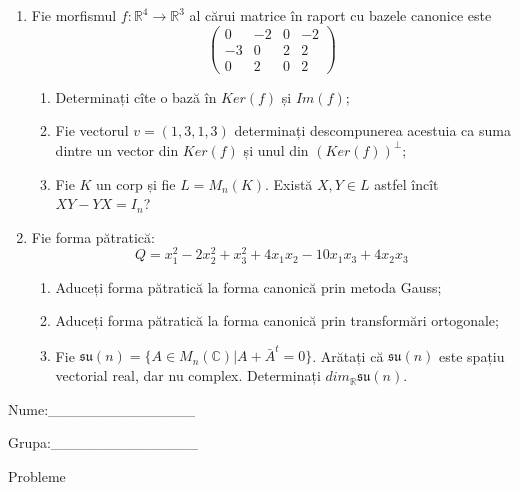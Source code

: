 \documentclass{article}
\begin{document}
\begin{enumerate}
 \item Fie morfismul $f:\mathbb{R}^4 \to \mathbb{R}^3$ al cărui matrice în raport cu bazele canonice este
$$\begin{pmatrix}
0&-2&0&-2\\
-3&0&2&2\\
0&2&0&2
\end{pmatrix}$$

\begin{enumerate}
\item Determinați cîte o bază în $Ker(f)$ și $Im(f)$;
\item Fie vectorul $v=(1,3,1,3)$ determinați descompunerea acestuia ca suma dintre un vector din $Ker(f)$ și unul din $(Ker(f))^\perp$;
\item Fie $K$ un corp și fie $L=M_n(K)$. Există $X,Y \in L$ astfel încît $XY-YX=I_n$?  
\end{enumerate}
\item Fie forma pătratică:
$$Q= x_1^2-2x_2^2+x_3^2+4x_1x_2-10x_1x_3+4x_2x_3$$

\begin{enumerate}
\item Aduceți forma pătratică la forma canonică prin metoda Gauss;
\item Aduceți forma pătratică la forma canonică prin transformări ortogonale;
\item Fie $\mathfrak{su}(n)=\{ A \in M_n(\mathbb{C}) | A+\bar{A}^t=0\}$. Arătați că $\mathfrak{su}(n)$ este spațiu vectorial real, dar nu complex.
Determinați $dim_{\mathbb{R}}\mathfrak{su}(n)$.
\end{enumerate}
\end{enumerate}
\newpage
\begin{flushright}
Nume:\_\_\_\_\_\_\_\_\_\_\_\_\_\_
 
 
Grupa:\_\_\_\_\_\_\_\_\_\_\_\_\_\_
\end{flushright}
\begin{center}
\vspace{2cm}
{\Large Probleme}
\vspace{2cm}
\end{center}
\end{document}
